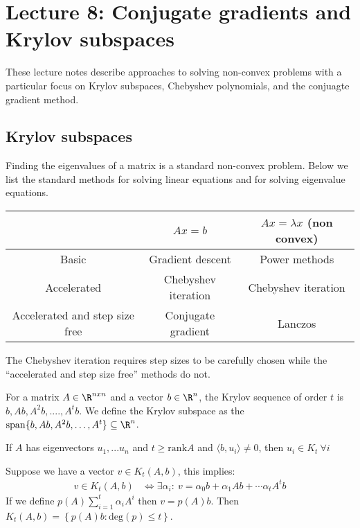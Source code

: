 
\section{Lecture 8: Conjugate gradients and Krylov subspaces}
These lecture notes describe approaches to solving non-convex problems with a particular focus on Krylov subspaces, Chebyshev polynomials, and the conjuagte gradient method.
\subsection{Krylov subspaces}
Finding the eigenvalues of a matrix is a standard non-convex problem. Below we list the standard methods for solving linear equations and for solving eigenvalue equations. 
\begin{center}
\begin{tabular}{ | c |c| c | } 
\hline
 & $Ax=b$ & $Ax=\lambda x$ (non convex) \\ 
\hline
Basic & Gradient descent & Power methods \\ 
\hline
Accelerated & Chebyshev iteration & Chebyshev iteration \\
\hline
Accelerated and step size free & Conjugate gradient & Lanczos \\
\hline
\end{tabular}
\end{center}
\begin{remark}[Chebyshev]
The Chebyshev iteration requires step sizes to be carefully chosen while the ``accelerated and step size free'' methods do not.
\end{remark}
\begin{definition}
For a matrix $A \in \R^{n x n}$ and a vector $b \in \R^n$, 
the Krylov sequence of order $t$ is $b, Ab, A^2b, ...., A^tb$. We define the Krylov subspace as the $\mathrm{span}\{b, Ab, A^2b, \ldots, A^t\} \subseteq \R^n$. 
\end{definition}
\begin{fact}
If $A$ has eigenvectors $u_1, ... u_n$ and $t \geq \mathrm{rank}{A}$ and $\langle b,u_i\rangle \neq 0$, then $u_i \in K_t \ \forall i$
\end{fact}


Suppose we have a vector $v \in K_t(A,b)$, this implies:
\begin{align*}
v \in K_t(A,b) &\Longleftrightarrow \exists \alpha_i: \ v= \alpha_0 b + \alpha_1 Ab + \cdots \alpha_t A^tb
\end{align*}
If we define $p(A) \sum_{i=1}^t \alpha_i A^i$ then $v = p(A)b$. Then $K_t(A,b) = \left\{ p(A)b : \text{deg}(p) \leq t \right\}$. \\

